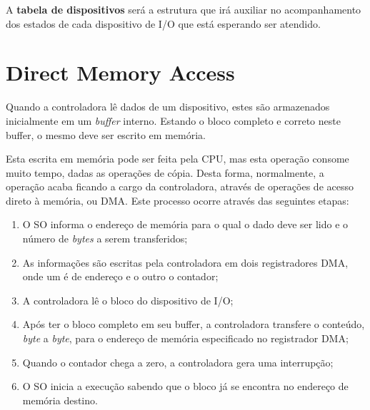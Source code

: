 A \textbf{tabela de dispositivos} será a estrutura que irá auxiliar no acompanhamento dos estados de cada dispositivo de I/O que está esperando ser atendido.






















\section{Direct Memory Access}
Quando a controladora lê dados de um dispositivo, estes são armazenados inicialmente em um \textit{buffer} interno. Estando o bloco completo e correto neste buffer, o mesmo deve ser escrito em memória.

Esta escrita em memória pode ser feita pela CPU, mas esta operação consome muito tempo, dadas as operações de cópia. Desta forma, normalmente, a operação acaba ficando a cargo da controladora, através de operações de acesso direto à memória, ou DMA. Este processo ocorre através das seguintes etapas:

\begin{enumerate}
  \item O SO informa o endereço de memória para o qual o dado deve ser lido e o número de \textit{bytes} a serem transferidos;

  \item As informações são escritas pela controladora em dois registradores DMA, onde um é de endereço e o outro o contador;

  \item A controladora lê o bloco do dispositivo de I/O;

  \item Após ter o bloco completo em seu buffer, a controladora transfere o conteúdo, \textit{byte} a \textit{byte}, para o endereço de memória especificado no registrador DMA;

  \item Quando o contador chega a zero, a controladora gera uma interrupção;

  \item O SO inicia a execução sabendo que o bloco já se encontra no endereço de memória destino.

\end{enumerate}























